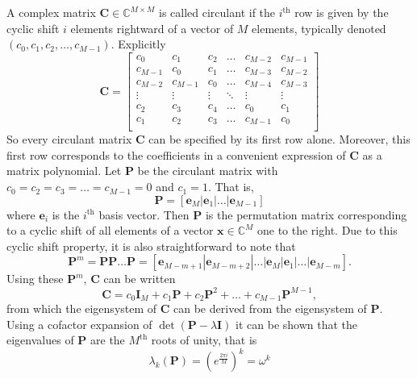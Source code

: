 \documentclass[letterpaper,12pt,oneside,final]{article}
\newcommand{\ve}[1]{\mathbf{#1}}           %
\newcommand{\m}[1]{\mathbf{#1}}               %
\newcommand{\field}[1]{\mathbb{#1}}
\newcommand{\Complex}{\field{C}}
\begin{document}
A complex matrix $\m{C} \in \Complex^{M \times M}$ is called circulant if the $i^{\text{th}}$ row is given by the cyclic shift $i$ elements rightward of a vector of $M$ elements, typically denoted $(c_0, c_1, c_2, \dots, c_{M-1})$. Explicitly
\begin{equation} \label{eq:explicitCirculant}
  \m{C} = \begin{bmatrix}
    c_0 & c_1 & c_2 & \dots & c_{M-2} & c_{M-1} \\
    c_{M-1} & c_0 & c_1 & \dots & c_{M-3} & c_{M-2} \\
    c_{M-2} & c_{M-1} & c_0 & \dots & c_{M-4} & c_{M-3} \\
    \vdots & \vdots & \vdots & \ddots & \vdots & \vdots \\
    c_2 & c_3 & c_4 & \dots & c_0 & c_1 \\
    c_1 & c_2 & c_3 & \dots & c_{M-1} & c_0 \\
    \end{bmatrix}
\end{equation}
So every circulant matrix $\m{C}$ can be specified by its first row alone. Moreover, this first row corresponds to the coefficients in a convenient expression of $\m{C}$ as a matrix polynomial. Let $\m{P}$ be the circulant matrix with $c_0 = c_2 = c_3 = \dots = c_{M-1} = 0$ and $c_1 = 1$. That is,
\begin{equation} \label{eq:pDef}
  \m{P} = [ \ve{e}_M | \ve{e}_1 | \dots | \ve{e}_{M-1} ]
\end{equation}
where $\ve{e}_i$ is the $i^{\text{th}}$ basis vector. Then $\m{P}$ is the permutation matrix corresponding to a cyclic shift of all elements of a vector $\ve{x} \in \Complex^M$ one to the right. Due to this cyclic shift property, it is also straightforward to note that
\begin{equation} \label{eq:powerPDef}
  \m{P}^m = \m{P} \m{P} \dots \m{P} = [ \ve{e}_{M-m+1} | \ve{e}_{M-m+2} | \dots | \ve{e}_M | \ve{e}_1 | \dots | \ve{e}_{M-m} ].
\end{equation}
Using these $\m{P}^m$, $\m{C}$ can be written
\begin{equation} \label{eq:circMatPol}
  \m{C} = c_0 \m{I}_M + c_1 \m{P} + c_2 \m{P}^2 + \dots + c_{M-1} \m{P}^{M-1},
\end{equation}
from which the eigensystem of $\m{C}$ can be derived from the eigensystem of $\m{P}$. Using a cofactor expansion of $\det (\m{P} - \lambda \m{I})$ it can be shown that the eigenvalues of $\m{P}$ are the $M^{\text{th}}$ roots of unity, that is
$$\lambda_k (\m{P}) = \left ( e^{\frac{2 \pi i}{M}} \right )^k = \omega^k$$
\end{document}
